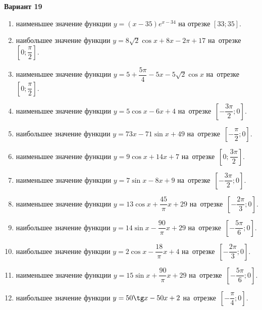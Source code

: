 \documentclass[a4paper,10pt]{article}
\begin{document}
\begin{center}\Large\textbf{Вариант 19}\end{center}

\begin{enumerate}
\item {} наименьшее значение функции $y = \left(x-35\right)e^{x-34}$ на отрезке $\left[33;35\right]$.

\item {} наибольшее значение функции $y = 8\sqrt{2}\cos x+8x-2\pi +17$ на~отрезке~$\left[0;\dfrac{\pi }{2}\right]$.

\item {} наименьшее значение функции $y=5+\dfrac{5\pi }{4}-5x-5\sqrt{2}\cos x$ на~отрезке~$\left[0;\dfrac{\pi }{2}\right]$.

\item {} наименьшее значение функции $y=5\cos x-6x+4$ на~отрезке~$\left[-\dfrac{3\pi }{2};0\right]$.

\item {} наибольшее значение функции $y = 73x-71\sin x+49$ на~отрезке~$\left[-\dfrac{\pi }{2};0\right]$.

\item {} наименьшее значение функции $y=9\cos x+14x+7$ на~отрезке~$\left[0;\dfrac{3\pi }{2}\right]$.

\item {} наименьшее значение функции $y=7\sin x-8x+9$ на~отрезке~$\left[-\dfrac{3\pi }{2};0\right]$.

\item {} наименьшее значение функции $y = 13\cos x+\dfrac{45}{\pi }x +29$ на~отрезке~$\left[-\dfrac{2\pi }{3};0\right]$.

\item {} наибольшее значение функции $y = 14\sin x-\dfrac{90}{\pi }x+29$ на~отрезке~$\left[-\dfrac{5\pi }{6};0\right]$.

\item {} наибольшее значение функции $y=2\cos x-\dfrac{18}{\pi }x+4$ на~отрезке~$\left[-\dfrac{2\pi }{3};0\right]$.

\item {} наименьшее значение функции $y = 15\sin x+\dfrac{90}{\pi }x+29$ на~отрезке~$\left[-\dfrac{5\pi }{6};0\right]$.

\item {} наибольшее значение функции $y = 50\tg x-50x+2$ на~отрезке~$\left[-\dfrac{\pi }{4};0\right]$.


\end{enumerate}
\end{document}
